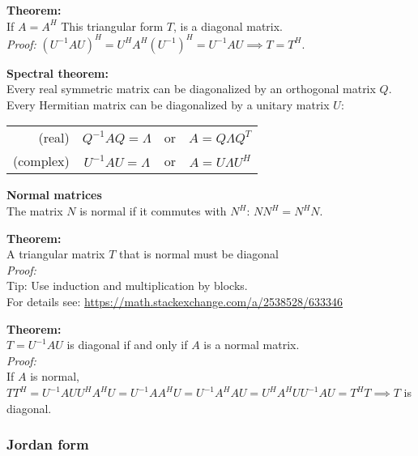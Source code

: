 \textbf{Theorem:}\\
If $A = A^H$ This triangular form $T$, is a diagonal matrix.\\
\textit{Proof:} $(U^{-1}AU)^H = U^HA^H(U^{-1})^H = U^{-1}AU \implies T = T^H$.

\vspace{6pt}

\textbf{Spectral theorem:}\\
Every real symmetric matrix can be diagonalized by an orthogonal matrix $Q$. Every Hermitian matrix can be diagonalized by a unitary matrix $U$:\\
\begin{center}
\begin{tabular}{rccc}
(real) & $Q^{-1}AQ = \Lambda$ & or & $A = Q\Lambda Q^T$\\
(complex) & $U^{-1}AU = \Lambda$ & or & $A = U\Lambda U^H$
\end{tabular}
\end{center}

\vspace{6pt}

\textbf{Normal matrices} \\
The matrix $N$ is normal if it commutes with $N^H$: $NN^H = N^HN$.


\vspace{6pt}

\textbf{Theorem:}\\
A triangular matrix $T$ that is normal must be diagonal\\
\textit{Proof:}\\
Tip: Use induction and multiplication by blocks.\\
For details see: \url{https://math.stackexchange.com/a/2538528/633346}



\vspace{6pt}

\textbf{Theorem:}\\
$T = U^{-1}AU$ is diagonal if and only if $A$ is a normal matrix.\\
\textit{Proof:}\\
If $A$ is normal, \\
$TT^H = U^{-1}AUU^HA^HU = U^{-1}AA^HU = U^{-1}A^HAU = U^HA^HUU^{-1}AU = T^HT \implies T$ is diagonal.

\subsubsection{Jordan form}

